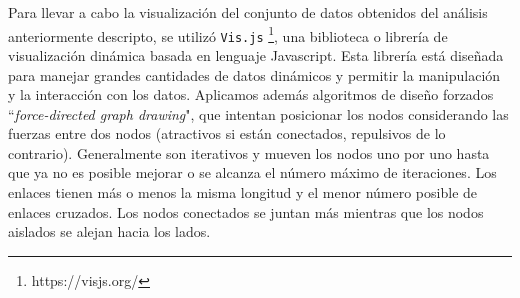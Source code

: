 Para llevar a cabo la visualización del conjunto de datos obtenidos del análisis anteriormente descripto, se utilizó \texttt{Vis.js} \footnote{https://visjs.org/}, una biblioteca o librería de visualización dinámica basada en lenguaje Javascript. Esta librería está diseñada para manejar grandes cantidades de datos dinámicos y permitir la manipulación y la interacción con los datos. 
Aplicamos además algoritmos de diseño forzados ``\textit{force-directed graph drawing}", que intentan posicionar los nodos considerando las fuerzas entre dos nodos (atractivos si están conectados, repulsivos de lo contrario). Generalmente son iterativos y mueven los nodos uno por uno hasta que ya no es posible mejorar o se alcanza el número máximo de iteraciones. Los enlaces tienen más o menos la misma longitud y el menor número posible de enlaces cruzados. Los nodos conectados se juntan más mientras que los nodos aislados se alejan hacia los lados.
